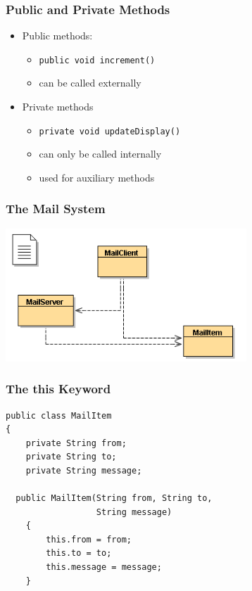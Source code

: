 \begin{frame}[fragile]
\frametitle{Public and Private Methods}
\begin{itemize}
\item Public methods:
\begin{itemize}
\item \lstinline!public void increment()‏!
\item can be called externally
\end{itemize}
\item Private methods
\begin{itemize}
\item \lstinline!private void updateDisplay()‏!
\item can only be called internally
\item used for auxiliary methods 
\end{itemize}
\end{itemize}
\end{frame}



\begin{frame}
\frametitle{The Mail System}
\begin{center}
\includegraphics[height=5cm, keepaspectratio]{./figures/mailclass}
\end{center}
\end{frame}

\begin{frame}[fragile]
\frametitle{The this Keyword}
\codelist
\begin{lstlisting}
public class MailItem
{
	private String from;
	private String to;
	private String message;

  public MailItem(String from, String to, 
                  String message)‏
    {
        this.from = from;
        this.to = to;
        this.message = message;
    }
\end{lstlisting}
\end{frame}

